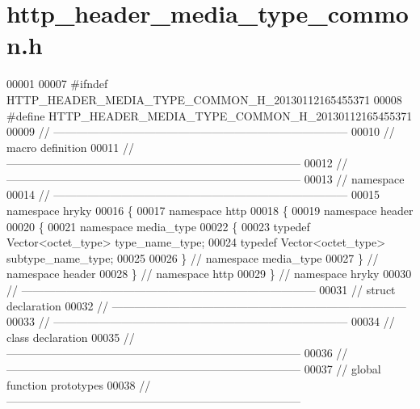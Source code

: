 \hypertarget{http__header__media__type__common_8h_source}{\section{http\-\_\-header\-\_\-media\-\_\-type\-\_\-common.\-h}
}

\begin{DoxyCode}
00001 
00007 \textcolor{preprocessor}{#ifndef HTTP\_HEADER\_MEDIA\_TYPE\_COMMON\_H\_20130112165455371}
00008 \textcolor{preprocessor}{}\textcolor{preprocessor}{#define HTTP\_HEADER\_MEDIA\_TYPE\_COMMON\_H\_20130112165455371}
00009 \textcolor{preprocessor}{}\textcolor{comment}{//
      ------------------------------------------------------------------------------}
00010 \textcolor{comment}{// macro definition}
00011 \textcolor{comment}{//
      ------------------------------------------------------------------------------}
00012 \textcolor{comment}{//
      ------------------------------------------------------------------------------}
00013 \textcolor{comment}{// namespace}
00014 \textcolor{comment}{//
      ------------------------------------------------------------------------------}
00015 \textcolor{keyword}{namespace }hryky
00016 \{
00017 \textcolor{keyword}{namespace }http
00018 \{
00019 \textcolor{keyword}{namespace }header
00020 \{
00021 \textcolor{keyword}{namespace }media\_type
00022 \{
00023     \textcolor{keyword}{typedef} Vector<octet\_type> type\_name\_type;
00024     \textcolor{keyword}{typedef} Vector<octet\_type> subtype\_name\_type;
00025     
00026 \} \textcolor{comment}{// namespace media\_type}
00027 \} \textcolor{comment}{// namespace header}
00028 \} \textcolor{comment}{// namespace http}
00029 \} \textcolor{comment}{// namespace hryky}
00030 \textcolor{comment}{//
      ------------------------------------------------------------------------------}
00031 \textcolor{comment}{// struct declaration}
00032 \textcolor{comment}{//
      ------------------------------------------------------------------------------}
00033 \textcolor{comment}{//
      ------------------------------------------------------------------------------}
00034 \textcolor{comment}{// class declaration}
00035 \textcolor{comment}{//
      ------------------------------------------------------------------------------}
00036 \textcolor{comment}{//
      ------------------------------------------------------------------------------}
00037 \textcolor{comment}{// global function prototypes}
00038 \textcolor{comment}{//
      ------------------------------------------------------------------------------}

\end{DoxyCode}

